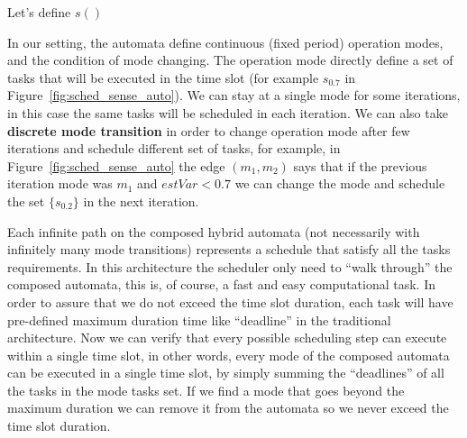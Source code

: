 \documentclass[ twoside, 12pt ]{article}
\begin{document}
{Let's define $s()$









In our setting, the automata define continuous (fixed period) operation modes, and the condition of mode changing.
The operation mode directly define a set of tasks that will be executed in the time slot (for example $s_{0.7}$ in Figure~\ref{fig:sched_sense_auto}).
We can stay at a single mode for some iterations, in this case the same tasks will be scheduled in each iteration. 
We can also take \textbf{discrete mode transition} in order to change operation mode after few iterations and schedule different set of tasks, for example, in Figure~\ref{fig:sched_sense_auto} the edge $(m_1,m_2)$ says that if the previous iteration mode was $m_1$ and $estVar < 0.7$ we can change the mode and schedule the set $\{s_{0.2}\}$ in the next iteration.

Each infinite path on the composed hybrid automata (not necessarily with infinitely many mode transitions) represents a schedule that satisfy all the tasks requirements. 
In this architecture the scheduler only need to ``walk through'' the composed automata, this is, of course, a fast and easy computational task. 
In order to assure that we do not exceed the time slot duration, each task will have pre-defined maximum duration time like ``deadline'' in the traditional architecture. Now we can verify that every possible scheduling step can execute within a single time slot, in other words, every mode of the composed automata can be executed in a single time slot, by simply summing the ``deadlines'' of all the tasks in the mode tasks set.
If we find a mode that goes beyond the maximum duration we can remove it from the automata so we never exceed the time slot duration.


\begin{figure}[]
    \centering
    
\end{figure}}
\end{document}
